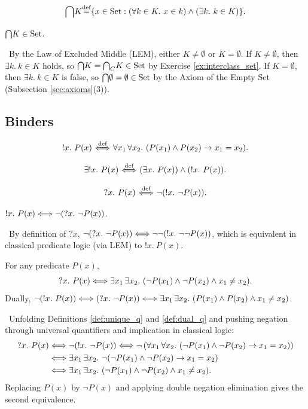 \documentclass[10pt,a4paper]{article}
\begin{document}
\begin{definition}
$${\bigcap} K {\stackrel{{\textrm{def}}}{=}} \{x \in {\textrm{Set}} : (\forall k\in K.\ x\in k)\land (\exists k.\ k\in K)\}.$$
\end{definition}

\begin{exercise}
${\bigcap} K \in {\textrm{Set}}$.
\end{exercise}
\myprf\ By the Law of Excluded Middle (LEM), either $K \neq \emptyset$ or $K = \emptyset$. If $K \neq \emptyset$, then $\exists k.\ k \in K$ holds, so ${\bigcap} K = {{\bigcap}_C} K \in {\textrm{Set}}$ by Exercise \ref{ex:interclass_set}. If $K = \emptyset$, then $\exists k.\ k \in K$ is false, so ${\bigcap} \emptyset = \emptyset \in {\textrm{Set}}$ by the Axiom of the Empty Set (Subsection \ref{sec:axioms}(3)). \myqed

\subsection{Binders}\label{sec:binders}
\begin{definition}\label{def:unique_q}
$$!x.\ P(x) \propdef \forall x_1\, \forall x_2.\ (P(x_1)\land P(x_2)\to x_1=x_2).$$
\end{definition}

\begin{definition}
$$\exists !x.\ P(x) \propdef (\exists x.\ P(x))\land(!x.\ P(x)).$$
\end{definition}

\begin{definition}\label{def:dual_q}
$$?x.\ P(x) {\stackrel{{\textrm{def}}}{\ \Longleftrightarrow\ }} \neg (!x.\ \neg P(x)).$$
\end{definition}

\begin{exercise}
$!x.\ P(x) \Longleftrightarrow \neg (?x.\ \neg P(x))$.
\end{exercise}
\myprf\ By definition of $?x$, $\neg (?x.\ \neg P(x)) \LRA \neg \neg (!x.\ \neg \neg P(x))$, which is equivalent in classical predicate logic (via LEM) to $!x.\ P(x)$. \myqed

\begin{lemma}
For any predicate $P(x)$,
$$?x.\ P(x) \LRA \exists x_1\, \exists x_2.\ (\neg P(x_1) \land \neg P(x_2) \land x_1 \neq x_2).$$
Dually, $\neg (!x.\ P(x)) \Longleftrightarrow (?x.\ \neg P(x)) \Longleftrightarrow \exists x_1\, \exists x_2.\ (P(x_1) \land P(x_2) \land x_1 \neq x_2)$.
\end{lemma}
\myprf\ Unfolding Definitions \ref{def:unique_q} and \ref{def:dual_q} and pushing negation through universal quantifiers and implication in classical logic:
\begin{align*}
?x.\ P(x) &\Longleftrightarrow \neg (!x.\ \neg P(x)) \Longleftrightarrow \neg \left(\forall x_1\, \forall x_2.\ (\neg P(x_1) \land \neg P(x_2) \to x_1 = x_2)\right) \\
&\Longleftrightarrow \exists x_1\, \exists x_2.\ \neg (\neg P(x_1) \land \neg P(x_2) \to x_1 = x_2) \\
&\Longleftrightarrow \exists x_1\, \exists x_2.\ (\neg P(x_1) \land \neg P(x_2) \land x_1 \neq x_2).
\end{align*}
Replacing $P(x)$ by $\neg P(x)$ and applying double negation elimination gives the second equivalence. \myqed
\end{document}
